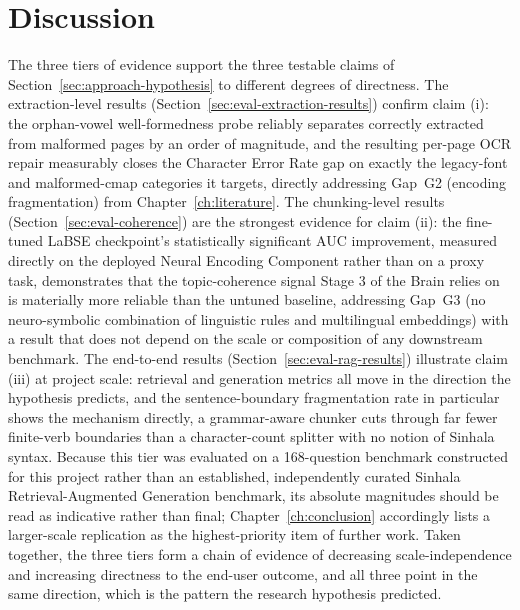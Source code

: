 \documentclass[12pt,a4paper,oneside]{report}
\begin{document}
\section{Discussion}
\label{sec:eval-discussion}
The three tiers of evidence support the three testable claims of Section~\ref{sec:approach-hypothesis} to different degrees of directness. The extraction-level results (Section~\ref{sec:eval-extraction-results}) confirm claim (i): the orphan-vowel well-formedness probe reliably separates correctly extracted from malformed pages by an order of magnitude, and the resulting per-page OCR repair measurably closes the Character Error Rate gap on exactly the legacy-font and malformed-cmap categories it targets, directly addressing Gap~G2 (encoding fragmentation) from Chapter~\ref{ch:literature}. The chunking-level results (Section~\ref{sec:eval-coherence}) are the strongest evidence for claim (ii): the fine-tuned LaBSE checkpoint's statistically significant AUC improvement, measured directly on the deployed Neural Encoding Component rather than on a proxy task, demonstrates that the topic-coherence signal Stage 3 of the Brain relies on is materially more reliable than the untuned baseline, addressing Gap~G3 (no neuro-symbolic combination of linguistic rules and multilingual embeddings) with a result that does not depend on the scale or composition of any downstream benchmark. The end-to-end results (Section~\ref{sec:eval-rag-results}) illustrate claim (iii) at project scale: retrieval and generation metrics all move in the direction the hypothesis predicts, and the sentence-boundary fragmentation rate in particular shows the mechanism directly, a grammar-aware chunker cuts through far fewer finite-verb boundaries than a character-count splitter with no notion of Sinhala syntax. Because this tier was evaluated on a 168-question benchmark constructed for this project rather than an established, independently curated Sinhala Retrieval-Augmented Generation benchmark, its absolute magnitudes should be read as indicative rather than final; Chapter~\ref{ch:conclusion} accordingly lists a larger-scale replication as the highest-priority item of further work. Taken together, the three tiers form a chain of evidence of decreasing scale-independence and increasing directness to the end-user outcome, and all three point in the same direction, which is the pattern the research hypothesis predicted.
\end{document}
